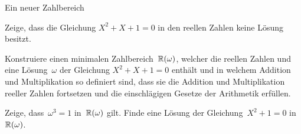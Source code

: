 \documentclass{algblatt}
\begin{document}
\begin{aufgabeE}{Ein neuer Zahlbereich}
\item
Zeige, dass die Gleichung $X^2 + X + 1 = 0$ in den reellen Zahlen
keine Lösung besitzt.
\item
Konstruiere einen minimalen Zahlbereich~$\mathbb{R}(\omega)$, welcher die
reellen Zahlen und eine Lösung~$\omega$ der Gleichung $X^2 + X + 1 = 0$
enthält und in welchem Addition und Multiplikation so definiert sind, dass sie
die Addition und Multiplikation reeller Zahlen fortsetzen und die
einschlägigen Gesetze der Arithmetik erfüllen.
\item Zeige, dass~$\omega^3 = 1$ in~$\mathbb{R}(\omega)$ gilt.
Finde eine Lösung der Gleichung~$X^2 + 1 = 0$ in~$\mathbb{R}(\omega)$.
\end{aufgabeE}
\end{document}
